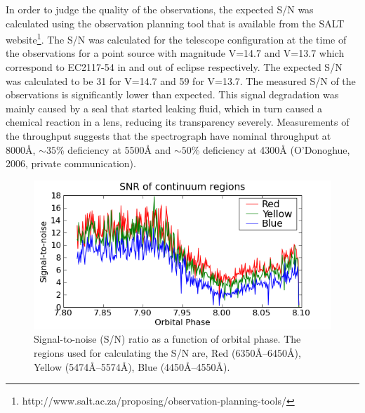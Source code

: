 In order to judge the quality of the observations, the expected S/N was calculated using the observation planning tool that is available from the SALT website\footnote{http://www.salt.ac.za/proposing/observation-planning-tools/}. The S/N was calculated for the telescope configuration at the time of the observations for a point source with magnitude V=14.7 and V=13.7 which correspond to EC2117-54 in and out of eclipse respectively. The expected S/N was calculated to be 31 for V=14.7 and 59 for V=13.7. The measured S/N of the observations is significantly lower than expected. This signal degradation was mainly caused by a seal that started leaking fluid, which in turn caused a chemical reaction in a lens, reducing its transparency severely. Measurements of the throughput suggests that the spectrograph have nominal throughput at 8000\AA, $\sim35$\% deficiency at 5500\AA \hspace{2pt} and $\sim50$\% deficiency at 4300\AA \hspace{2pt} (O'Donoghue, 2006, private communication). 

\begin{figure}
\centering
\includegraphics[width=0.8\columnwidth, bb=0 0 600 300]{spectroscopy/snr/continuum_snr.png}
\caption[Signal-to-noise curves]{Signal-to-noise (S/N) ratio as a function of orbital phase. The regions used for calculating the S/N are, Red (6350\AA--6450\AA), Yellow (5474\AA--5574\AA), Blue (4450\AA--4550\AA). } 
\label{snr}
\end{figure}



